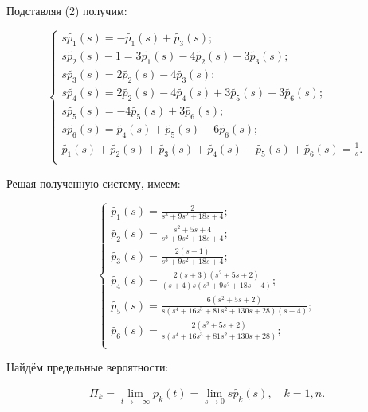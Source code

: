 \documentclass[14pt,a4paper]{scrartcl}
\begin{document}
Подставляя (2) получим:

\begin{equation*}
\begin{cases}
s\widetilde{p_1}(s) = -\widetilde{p_1}(s) + \widetilde{p_3}(s);\\
s\widetilde{p_2}(s) - 1 = 3\widetilde{p_1}(s) - 4\widetilde{p_2}(s) + 3\widetilde{p_3}(s);\\
s\widetilde{p_3}(s) = 2\widetilde{p_2}(s) - 4\widetilde{p_3}(s);\\
s\widetilde{p_4}(s) = 2\widetilde{p_2}(s) - 4\widetilde{p_4}(s) + 3\widetilde{p_5}(s) + 3\widetilde{p_6}(s);\\
s\widetilde{p_5}(s) = -4\widetilde{p_5}(s) + 3\widetilde{p_6}(s);\\
s\widetilde{p_6}(s) = \widetilde{p_4}(s) + \widetilde{p_5}(s) - 6\widetilde{p_6}(s);\\

\widetilde{p_1}(s) + \widetilde{p_2}(s) + \widetilde{p_3}(s) + \widetilde{p_4}(s) + \widetilde{p_5}(s) + \widetilde{p_6}(s) = \frac{1}{s}.\\
\end{cases}
\end{equation*}

Решая полученную систему, имеем:

\begin{equation*}
	\begin{cases}
		\widetilde{p_1}(s) = \frac{2}{s^{3}+9 s^{2}+18 s+4};\\
		\widetilde{p_2}(s) = \frac{s^{2}+5 s+4}{s^{3}+9 s^{2}+18 s+4};\\
		\widetilde{p_3}(s) = \frac{2(s+1)}{s^{3}+9 s^{2}+18 s+4};\\
		\widetilde{p_4}(s) = \frac{2(s+3)\left(s^{2}+5 s+2\right)}{(s+4) s\left(s^{3}+9 s^{2}+18 s+4\right)};\\
		\widetilde{p_5}(s) = \frac{6\left(s^{2}+5 s+2\right)}{s\left(s^{4}+16 s^{3}+81 s^{2}+130 s+28\right)(s+4)};\\
		\widetilde{p_6}(s) = \frac{2\left(s^{2}+5 s+2\right)}{s\left(s^{4}+16 s^{3}+81 s^{2}+130 s+28\right)};\\
	\end{cases}
\end{equation*}

Найдём предельные вероятности:

\begin{equation*}
	\Pi_k = \lim\limits_{t\rightarrow + \infty} p_k(t) = \lim\limits_{s\rightarrow 0 }s\widetilde{p_k}(s), \quad k=\overline{1,n}.
\end{equation*}
\end{document}
